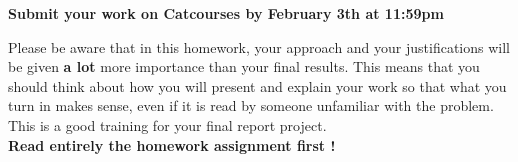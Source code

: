 \documentclass[11pt]{article}
\begin{document}
{\bf Submit your work on Catcourses by February 3th at 11:59pm}

Please be aware that in this homework, your approach and your justifications will be given {\bf a lot} more importance than your final results. This means that you should think about how you will present and explain your work so that what you turn in makes sense, even if it is read by someone unfamiliar with the problem. This is a good training for your final report project.\\
\textbf{Read entirely the homework assignment first !}

\end{document}

